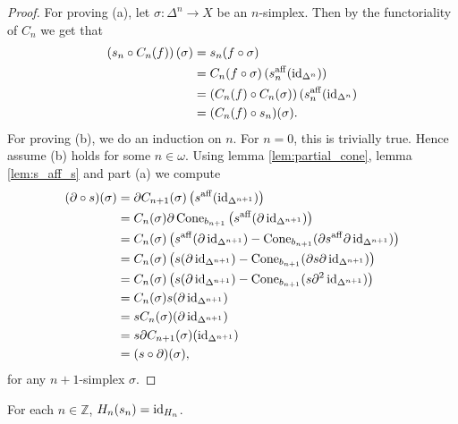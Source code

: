 \begin{proof}
	For proving (a), let $\sigma : \Delta^n \to X$ be an $n$-simplex. Then by the functoriality of $C_n$ we get that
	\begin{align*}
		\del[0]{s_n \circ C_n(f)}(\sigma) &= s_n(f \circ \sigma)\\
		&= C_n(f \circ \sigma)\del[0]{s_n^{\mathrm{aff}}(\id_{\Delta^n})}\\ 
		&= \del[0]{C_n(f) \circ C_n(\sigma)}(s^{\mathrm{aff}}_n(\id_{\Delta^n})\\ 
		&= (C_n(f) \circ s_n)(\sigma).
	\end{align*}
	For proving (b), we do an induction on $n$. For $n = 0$, this is trivially true. Hence assume (b) holds for some $n \in \omega$. Using lemma \ref{lem:partial_cone}, lemma \ref{lem:s_aff_s} and part (a) we compute
	\begin{align*}
		(\partial \circ s)(\sigma) &= \partial C_{n + 1}(\sigma) \del[1]{s^{\mathrm{aff}}(\id_{\Delta^{n+1}})}\\
		&= C_n(\sigma)\partial\Cone_{b_{n + 1}}\del[1]{s^{\mathrm{aff}}(\partial\id_{\Delta^{n+1}})}\\
		&= C_n(\sigma)\del[1]{s^{\mathrm{aff}}(\partial\id_{\Delta^{n+1}}) - \Cone_{b_{n + 1}}(\partial s^{\mathrm{aff}}\partial\id_{\Delta^{n+1}})}\\
		&= C_n(\sigma)\del[1]{s(\partial\id_{\Delta^{n+1}}) - \Cone_{b_{n + 1}}(\partial s\partial\id_{\Delta^{n+1}})}\\
		&= C_n(\sigma)\del[1]{s(\partial\id_{\Delta^{n+1}}) - \Cone_{b_{n + 1}}(s\partial^2\id_{\Delta^{n+1}})}\\
		&= C_n(\sigma)s(\partial\id_{\Delta^{n+1}})\\
		&= sC_n(\sigma)(\partial\id_{\Delta^{n+1}})\\
		&= s \partial C_{n + 1}(\sigma)(\id_{\Delta^{n + 1}})\\
		&= (s \circ \partial)(\sigma),
	\end{align*}
	\noindent for any $n + 1$-simplex $\sigma$.
\end{proof}

\begin{theorem}
	\label{<++>}
	For each $n \in \mathbb{Z}$, $H_n(s_n) = \operatorname{id}_{H_n}$.
\end{theorem}
